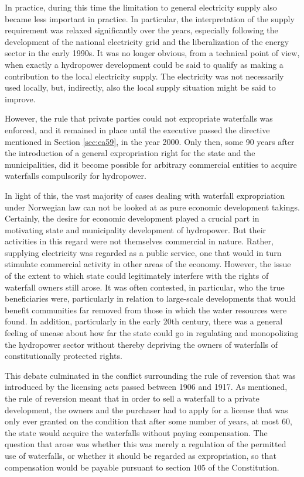 In practice, during this time the limitation to general electricity supply also became less important in practice. In particular, the interpretation of the supply requirement was relaxed significantly over the years, especially following the development of the national electricity grid and the liberalization of the energy sector in the early 1990s. It was no longer obvious, from a technical point of view, when exactly a hydropower development could be said to qualify as making a contribution to the local electricity supply. The electricity was not necessarily used locally, but, indirectly, also the local supply situation might be said to improve.

However, the rule that private parties could not expropriate waterfalls was enforced, and it remained in place until the executive passed the directive mentioned in Section \ref{sec:ea59}, in the year 2000. Only then, some 90 years after the introduction of a general expropriation right for the state and the municipalities, did it become possible for arbitrary commercial entities to acquire waterfalls compulsorily for hydropower.

In light of this, the vast majority of cases dealing with waterfall expropriation under Norwegian law can not be looked at as pure economic development takings. Certainly, the desire for economic development played a crucial part in motivating state and municipality development of hydropower. But their activities in this regard were not themselves commercial in nature. Rather, supplying electricity was regarded as a public service, one that would in turn stimulate commercial activity in other areas of the economy. However, the issue of the extent to which state could legitimately interfere with the rights of waterfall owners still arose. It was often contested, in particular, who the true beneficiaries were, particularly in relation to large-scale developments that would benefit communities far removed from those in which the water resources were found. In addition, particularly in the early 20th century, there was a general feeling of unease about how far the state could go in regulating and monopolizing the hydropower sector without thereby depriving the owners of waterfalls of constitutionally protected rights.

This debate culminated in the conflict surrounding the rule of reversion that was introduced by the licensing acts passed between 1906 and 1917. As mentioned, the rule of reversion meant that in order to sell a waterfall to a private development, the owners and the purchaser had to apply for a license that was only ever granted on the condition that after some number of years, at most 60, the state would acquire the waterfalls without paying compensation. The question that arose was whether this was merely a regulation of the permitted use of waterfalls, or whether it should be regarded as expropriation, so that compensation would be payable pursuant to section 105 of the Constitution.

